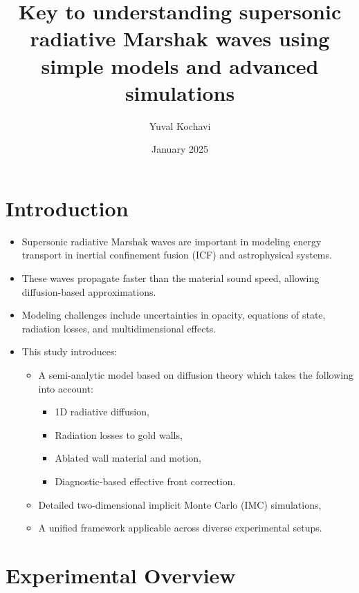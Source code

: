 \documentclass{article}
\title{Key to understanding supersonic radiative Marshak waves using simple
models and advanced simulations}
\author{Yuval Kochavi}
\date{January 2025}
\begin{document}
\maketitle

\section{Introduction}

\begin{itemize}
    \item Supersonic radiative Marshak waves are important in modeling energy transport in inertial confinement fusion (ICF) and astrophysical systems.
    \item These waves propagate faster than the material sound speed, allowing diffusion-based approximations.
    \item Modeling challenges include uncertainties in opacity, equations of state, radiation losses, and multidimensional effects.
    \item This study introduces:
    \begin{itemize}
        \item A semi-analytic model based on diffusion theory which takes the following into account:
        \begin{itemize}
            \item 1D radiative diffusion,
            \item Radiation losses to gold walls,
            \item Ablated wall material and motion,
            \item Diagnostic-based effective front correction.
        \end{itemize}
        \item Detailed two-dimensional implicit Monte Carlo (IMC) simulations,
        \item A unified framework applicable across diverse experimental setups.
    \end{itemize}
\end{itemize}

\section{Experimental Overview}
\end{document}
